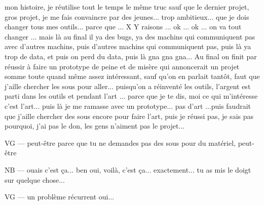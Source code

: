 mon histoire, je réutilise tout le temps le même truc sauf que le dernier projet, gros projet, je me fais convaincre par des jeunes... trop ambitieux... que je dois changer tous mes outils... parce que ... X Y raisons ... ok ... ok ... on va tout changer ... mais là au final il ya des bugs, ya des machins qui communiquent pas avec d'autres machins, puis d'autres machins qui communiquent pas, puis là  ya trop de data, et puis on perd du data, puis là gna gna gna... Au final on finit par réussir à faire un prototype de peine et de misère qui annoncerait un projet somme toute quand même assez intéressant, sauf qu'on en parlait tantôt, faut que j'aille chercher les sous pour aller... puisqu'on a réinventé les outils, l'argent est parti dans les outils et pendant l'art ... parce que je te dis, moi ce qui m'intéresse c'est l'art...  puis là je me ramasse avec un prototype... pas d'art ...puis faudrait que j'aille chercher des sous encore pour faire l'art, puis je réussi pas, je sais pas pourquoi, j'ai pas le don, les gens n'aiment pas le projet...


VG — peut-être parce que tu ne demandes pas des sous pour du matériel, peut-être

NB — ouais c'est ça... ben oui, voilà, c'est ça... exactement... tu as mis le doigt sur quelque chose...

VG — un problème récurrent oui...

